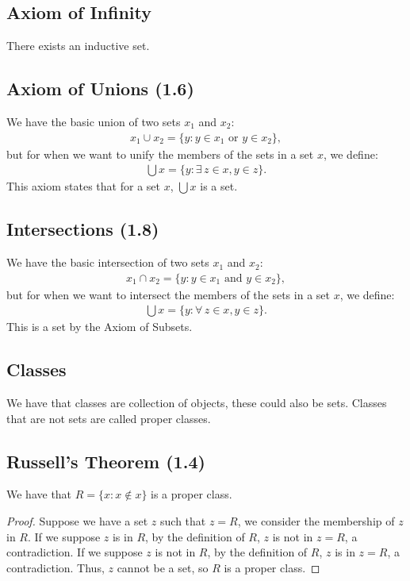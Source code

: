 \subsection{Axiom of Infinity}

There exists an inductive set.

\subsection{Axiom of Unions (1.6)} \label{1.6}

We have the basic union of two sets $x_1$ and $x_2$: \begin{align*}
    x_1 \cup x_2 = \{y : y \in x_1 \text{ or } y \in x_2\},
\end{align*} but for when we want to unify the members of the sets in
a set $x$, we define: \begin{align*}
    \bigcup x = \{y : \exists \, z \in x, y \in z\}.
\end{align*} This axiom states that for a set $x$, $\bigcup x$ is a set. 

\subsection{Intersections (1.8)} \label{1.8}

We have the basic intersection of two sets $x_1$ and $x_2$: \begin{align*}
    x_1 \cap x_2 = \{y : y \in x_1 \text{ and } y \in x_2\},
\end{align*} but for when we want to intersect the members of 
the sets in a set $x$, we define: \begin{align*}
    \bigcup x = \{y : \forall \, z \in x, y \in z\}.
\end{align*} This is a set by the Axiom of Subsets.

\subsection{Classes}

We have that classes are collection of objects, these could also be sets.
Classes that are not sets are called proper classes.

\subsection{Russell's Theorem (1.4)} \label{1.4}

We have that $R = \{x : x \notin x\}$ is a proper class.
\begin{proof}
    Suppose we have a set $z$ such that $z = R$, we consider the membership of $z$
    in $R$. If we suppose $z$ is in $R$, by the definition of $R$, $z$ is not in
    $z = R$, a contradiction. If we suppose $z$ is not in $R$, by the definition 
    of $R$, $z$ is in $z = R$, a contradiction. Thus, $z$ cannot be a set,
    so $R$ is a proper class.
\end{proof}


